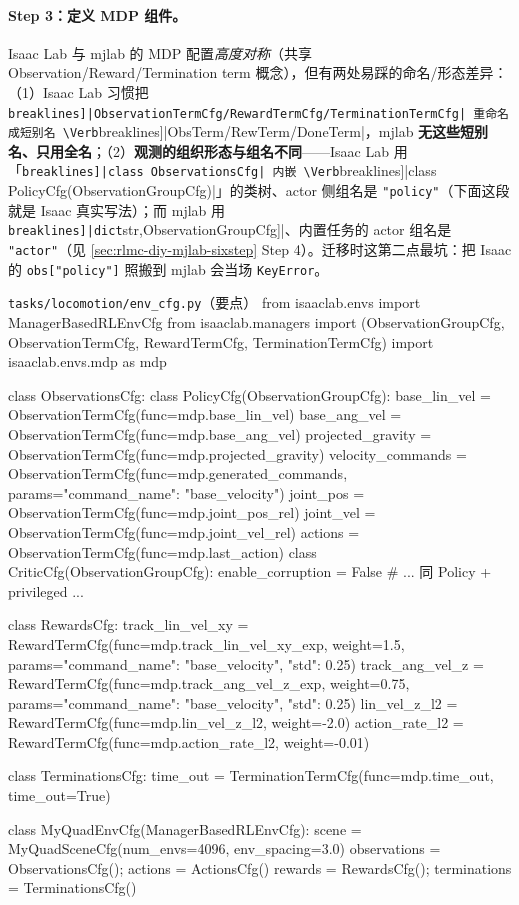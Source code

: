 \paragraph{Step 3：定义 MDP 组件。}Isaac Lab 与 mjlab 的 MDP 配置\emph{高度对称}（共享 Observation/Reward/Termination term 概念），但有两处易踩的命名/形态差异：（1）Isaac Lab 习惯把 \Verb[breaklines]|ObservationTermCfg/RewardTermCfg/TerminationTermCfg| 重命名成短别名 \Verb[breaklines]|ObsTerm/RewTerm/DoneTerm|，mjlab \textbf{无这些短别名、只用全名}；（2）\textbf{观测的组织形态与组名不同}——Isaac Lab 用「\Verb[breaklines]|class ObservationsCfg| 内嵌 \Verb[breaklines]|class PolicyCfg(ObservationGroupCfg)|」的类树、actor 侧组名是 \verb|"policy"|（下面这段就是 Isaac 真实写法）；而 mjlab 用 \Verb[breaklines]|dict[str,ObservationGroupCfg]|、内置任务的 actor 组名是 \verb|"actor"|（见 \cref{sec:rlmc-diy-mjlab-sixstep} Step 4）。迁移时这第二点最坑：把 Isaac 的 \verb|obs["policy"]| 照搬到 mjlab 会当场 \verb|KeyError|。

\begin{codebox}[Python]{\texttt{tasks/\allowbreak locomotion/\allowbreak env\_cfg.\allowbreak py}（要点）}
from isaaclab.envs import ManagerBasedRLEnvCfg
from isaaclab.managers import (ObservationGroupCfg, ObservationTermCfg,
                               RewardTermCfg, TerminationTermCfg)
import isaaclab.envs.mdp as mdp

class ObservationsCfg:
    class PolicyCfg(ObservationGroupCfg):
        base_lin_vel      = ObservationTermCfg(func=mdp.base_lin_vel)
        base_ang_vel      = ObservationTermCfg(func=mdp.base_ang_vel)
        projected_gravity = ObservationTermCfg(func=mdp.projected_gravity)
        velocity_commands = ObservationTermCfg(func=mdp.generated_commands,
                                params={"command_name": "base_velocity"})
        joint_pos = ObservationTermCfg(func=mdp.joint_pos_rel)
        joint_vel = ObservationTermCfg(func=mdp.joint_vel_rel)
        actions   = ObservationTermCfg(func=mdp.last_action)
    class CriticCfg(ObservationGroupCfg):
        enable_corruption = False
        # ... 同 Policy + privileged ...

class RewardsCfg:
    track_lin_vel_xy = RewardTermCfg(func=mdp.track_lin_vel_xy_exp, weight=1.5,
                        params={"command_name": "base_velocity", "std": 0.25})
    track_ang_vel_z  = RewardTermCfg(func=mdp.track_ang_vel_z_exp, weight=0.75,
                        params={"command_name": "base_velocity", "std": 0.25})
    lin_vel_z_l2     = RewardTermCfg(func=mdp.lin_vel_z_l2,   weight=-2.0)
    action_rate_l2   = RewardTermCfg(func=mdp.action_rate_l2, weight=-0.01)

class TerminationsCfg:
    time_out = TerminationTermCfg(func=mdp.time_out, time_out=True)

class MyQuadEnvCfg(ManagerBasedRLEnvCfg):
    scene = MyQuadSceneCfg(num_envs=4096, env_spacing=3.0)
    observations = ObservationsCfg(); actions = ActionsCfg()
    rewards = RewardsCfg(); terminations = TerminationsCfg()
\end{codebox}

